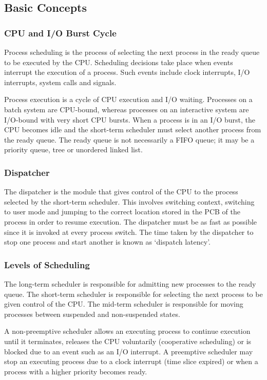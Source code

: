 \subsection{Basic Concepts}

\subsubsection{CPU and I/O Burst Cycle}

Process scheduling is the process of selecting the next process in the ready queue to be executed by the CPU\@.
Scheduling decisions take place when events interrupt the execution of a process.
Such events include clock interrupts, I/O interrupts, system calls and signals.

Process execution is a cycle of CPU execution and I/O waiting.
Processes on a batch system are CPU-bound, whereas processes on an interactive system are I/O-bound with very short CPU bursts.
When a process is in an I/O burst, the CPU becomes idle and the short-term scheduler must select another process from the ready queue.
The ready queue is not necessarily a FIFO queue; it may be a priority queue, tree or unordered linked list.

\subsubsection{Dispatcher}

The dispatcher is the module that gives control of the CPU to the process selected by the short-term scheduler.
This involves switching context, switching to user mode and jumping to the correct location stored in the PCB of the process in order to resume execution.
The dispatcher must be as fast as possible since it is invoked at every process switch.
The time taken by the dispatcher to stop one process and start another is known as `dispatch latency'.

\subsubsection{Levels of Scheduling}

The long-term scheduler is responsible for admitting new processes to the ready queue.
The short-term scheduler is responsible for selecting the next process to be given control of the CPU\@.
The mid-term scheduler is responsible for moving processes between suspended and non-suspended states.

A non-preemptive scheduler allows an executing process to continue execution until it terminates, releases the CPU voluntarily (cooperative scheduling) or is blocked due to an event such as an I/O interrupt.
A preemptive scheduler may stop an executing process due to a clock interrupt (time slice expired) or when a process with a higher priority becomes ready.

